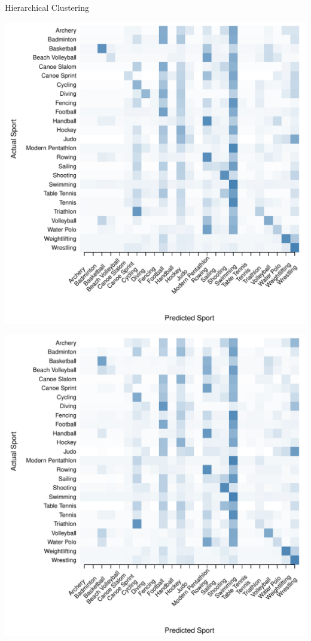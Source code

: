 \documentclass[landscape, paperwidth=42in, paperheight=36in,
fontscale=.35, margin=1in]{baposter}
\begin{document}
\begin{poster}
{  \begin{center}
  Hierarchical Clustering \\
  \begin{minipage}{0.45\textwidth}
    \begin{center}
      \includegraphics[scale=0.27]{../graphics/sportMclust-trn.pdf}
    \end{center}
  \end{minipage}
  \hspace{0.05\textwidth}
  \begin{minipage}{0.45\textwidth}
    \begin{center}
      \includegraphics[scale=0.27]{../graphics/sportMclust-tst.pdf}

\end{center}
\end{minipage}
\end{center}}
\end{poster}
\end{document}
